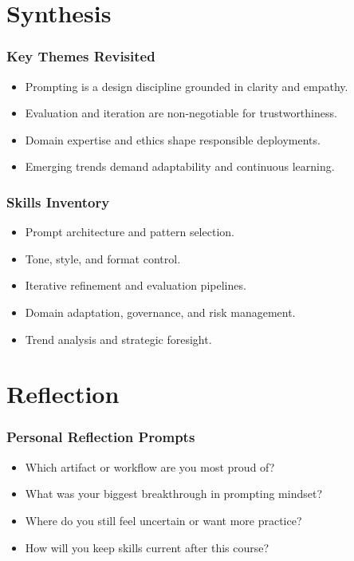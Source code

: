 \documentclass{beamer}
\begin{document}
\section{Synthesis}

\begin{frame}
    \frametitle{Key Themes Revisited}
    \begin{itemize}
        \item Prompting is a design discipline grounded in clarity and empathy.
        \item Evaluation and iteration are non-negotiable for trustworthiness.
        \item Domain expertise and ethics shape responsible deployments.
        \item Emerging trends demand adaptability and continuous learning.
    \end{itemize}
\end{frame}

\begin{frame}
    \frametitle{Skills Inventory}
    \begin{itemize}
        \item Prompt architecture and pattern selection.
        \item Tone, style, and format control.
        \item Iterative refinement and evaluation pipelines.
        \item Domain adaptation, governance, and risk management.
        \item Trend analysis and strategic foresight.
    \end{itemize}
\end{frame}

\section{Reflection}

\begin{frame}
    \frametitle{Personal Reflection Prompts}
    \begin{itemize}
        \item Which artifact or workflow are you most proud of?
        \item What was your biggest breakthrough in prompting mindset?
        \item Where do you still feel uncertain or want more practice?
        \item How will you keep skills current after this course?
    \end{itemize}
\end{frame}
\end{document}
